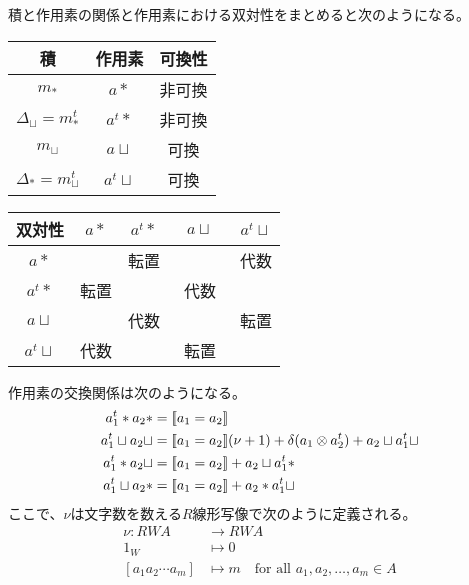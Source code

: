 		積と作用素の関係と作用素における双対性をまとめると次のようになる。
		\begin{minipage}{0.5\hsize}
			\begin{center}\begin{tabular}{ccc}
				積 & 作用素 & 可換性 \\ \hline
				$m_*$ & $a*$ & 非可換 \\
				$\Delta_\sqcup=m_*^t$ & $a^t*$ & 非可換 \\
				$m_\sqcup$ & $a\sqcup$ & 可換 \\
				$\Delta_*=m_\sqcup^t$ & $a^t\sqcup$ & 可換 \\
			\end{tabular}\end{center}
		\end{minipage}
		\begin{minipage}{0.5\hsize}
			\begin{center}\begin{tabular}{c|cccc}
				双対性 & $a*$ & $a^t*$ & $a\sqcup$ & $a^t\sqcup$ \\ \hline
				$a*$ & & 転置 & & 代数 \\
				$a^t*$ & 転置 & & 代数　\\
				$a\sqcup$ & & 代数 & & 転置 \\
				$a^t\sqcup$ & 代数 & & 転置 \\
			\end{tabular}\end{center}
		\end{minipage}
		作用素の交換関係は次のようになる。
		\begin{equation}\label{eq:作用素の交換関係}\begin{split} %
			a_1^t* a_2* &= \jump{a_1=a_2} \\
			a_1^t\sqcup a_2\sqcup &= \jump{a_1=a_2}(\nu + 1) 
				+ \delta(a_1\otimes a_2^t)+ a_2\sqcup a_1^t\sqcup \\
			a_1^t* a_2\sqcup &= \jump{a_1=a_2} + a_2\sqcup a_1^t* \\
			a_1^t\sqcup a_2* &= \jump{a_1=a_2} + a_2* a_1^t\sqcup \\
		\end{split}\end{equation} %
		ここで、$\nu$は文字数を数える$R$線形写像で次のように定義される。
		\begin{equation*}\begin{split} %
			\nu: RWA &\to RWA \\
			1_W &\mapsto 0 \\
			[a_1a_2\cdots a_m] &\mapsto m \quad\text{for all }a_1,a_2,\dots,a_m\in A
		\end{split}\end{equation*} %
